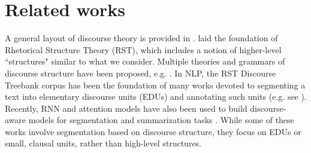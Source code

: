 \section{Related works} \label{sec:related_works}




A general layout of discourse theory is provided in \citet{grimes1972thread}. \citet{mann1988rhetorical} laid the foundation of Rhetorical Structure Theory (RST), which includes a notion of higher-level ``structures" similar to what we consider. Multiple theories and grammars of discourse structure have been proposed, e.g. \citet{grosz1986attention, polanyi1983syntax, polanyi1996linguistic, asher2003logics}. In NLP, the RST Discourse Treebank corpus has been the foundation of many works devoted to segmenting a text into elementary discourse units (EDUs) and annotating such units (e.g. see \citet{ferracane2019news}). Recently, RNN and attention models have also been used to build discourse-aware models for segmentation and summarization tasks \cite{wangetal2018toward, cohan2018discourse, xu2019discourse}. While some of these works involve segmentation based on discourse structure, they focus on EDUs or small, clausal units, rather than high-level structures.
 

